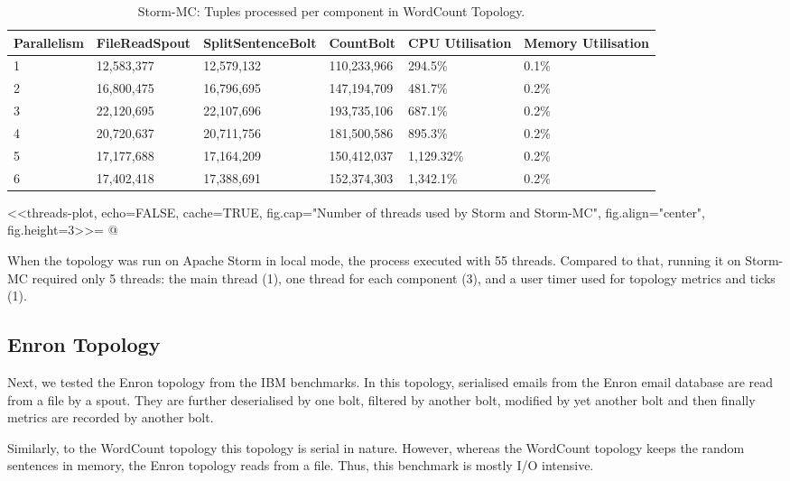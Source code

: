 \medskip
\begin{table}
\begin{adjustwidth}{-0.5in}{-0.5in}
\centering
\small
\begin{tabular}{@{}llllll@{}}
    {Parallelism} & {FileReadSpout} & {SplitSentenceBolt} & {CountBolt} & {CPU Utilisation} & {Memory Utilisation} \\ \toprule
    1 & {12,583,377} & {12,579,132} & {110,233,966} & {294.5\%} & {0.1\%} \\
    2 & {16,800,475} & {16,796,695} & {147,194,709} & {481.7\%} & {0.2\%} \\
    3 & {22,120,695} & {22,107,696} & {193,735,106} & {687.1\%} & {0.2\%} \\
    4 & {20,720,637} & {20,711,756} & {181,500,586} & {895.3\%} & {0.2\%} \\
	5 & {17,177,688} & {17,164,209} & {150,412,037} & {1,129.32\%} & {0.2\%} \\
	6 & {17,402,418} & {17,388,691} & {152,374,303} & {1,342.1\%} & {0.2\%} \\
\end{tabular}
\caption{Storm-MC: Tuples processed per component in WordCount Topology.}
\end{adjustwidth}
\label{table:wordcount}
\end{table}
\medskip

<<threads-plot, echo=FALSE, cache=TRUE, fig.cap="Number of threads used by Storm and Storm-MC", fig.align="center", fig.height=3>>=
@


When the topology was run on Apache Storm in local mode, the process executed with 55 threads. Compared to that, running it on Storm-MC required only 5 threads: the main thread (1), one thread for each component (3), and a user timer used for topology metrics and ticks (1).

\subsection{Enron Topology}

Next, we tested the Enron topology from the IBM benchmarks. In this topology, serialised emails from the Enron email database are read from a file by a spout. They are further deserialised by one bolt, filtered by another bolt, modified by yet another bolt and then finally metrics are recorded by another bolt.

Similarly, to the WordCount topology this topology is serial in nature. However, whereas the WordCount topology keeps the random sentences in memory, the Enron topology reads from a file. Thus, this benchmark is mostly I/O intensive.

